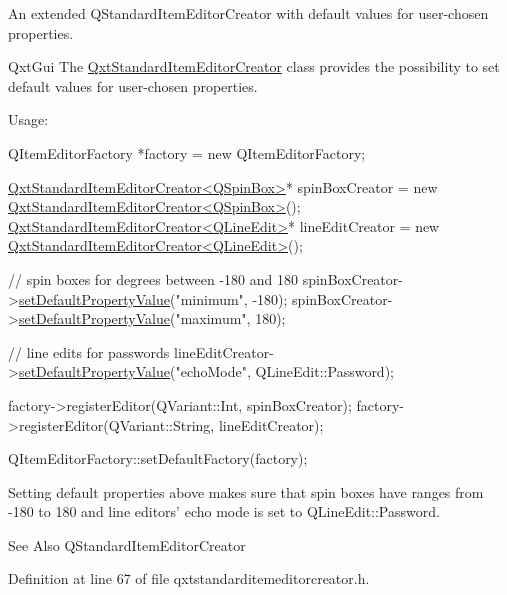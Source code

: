 An extended Q\-Standard\-Item\-Editor\-Creator with default values for user-\/chosen properties. 

Qxt\-Gui The \hyperlink{class_qxt_standard_item_editor_creator}{Qxt\-Standard\-Item\-Editor\-Creator} class provides the possibility to set default values for user-\/chosen properties.

Usage\-: 
\begin{DoxyCode}
QItemEditorFactory *factory = \textcolor{keyword}{new} QItemEditorFactory;

\hyperlink{class_qxt_standard_item_editor_creator}{QxtStandardItemEditorCreator<QSpinBox>}* spinBoxCreator = \textcolor{keyword}{new} 
      \hyperlink{class_qxt_standard_item_editor_creator}{QxtStandardItemEditorCreator<QSpinBox>}();
\hyperlink{class_qxt_standard_item_editor_creator}{QxtStandardItemEditorCreator<QLineEdit>}* lineEditCreator = \textcolor{keyword}{new} 
      \hyperlink{class_qxt_standard_item_editor_creator}{QxtStandardItemEditorCreator<QLineEdit>}();

\textcolor{comment}{// spin boxes for degrees between -180 and 180}
spinBoxCreator->\hyperlink{class_qxt_item_editor_creator_base_a2864edf86fe3807916d7db88db899f13}{setDefaultPropertyValue}(\textcolor{stringliteral}{"minimum"}, -180);
spinBoxCreator->\hyperlink{class_qxt_item_editor_creator_base_a2864edf86fe3807916d7db88db899f13}{setDefaultPropertyValue}(\textcolor{stringliteral}{"maximum"}, 180);

\textcolor{comment}{// line edits for passwords}
lineEditCreator->\hyperlink{class_qxt_item_editor_creator_base_a2864edf86fe3807916d7db88db899f13}{setDefaultPropertyValue}(\textcolor{stringliteral}{"echoMode"}, QLineEdit::Password);

factory->registerEditor(QVariant::Int, spinBoxCreator);
factory->registerEditor(QVariant::String, lineEditCreator);

QItemEditorFactory::setDefaultFactory(factory);
\end{DoxyCode}


Setting default properties above makes sure that spin boxes have ranges from -\/180 to 180 and line editors' echo mode is set to Q\-Line\-Edit\-::\-Password.

\begin{DoxySeeAlso}{See Also}
Q\-Standard\-Item\-Editor\-Creator 
\end{DoxySeeAlso}


Definition at line 67 of file qxtstandarditemeditorcreator.\-h.



